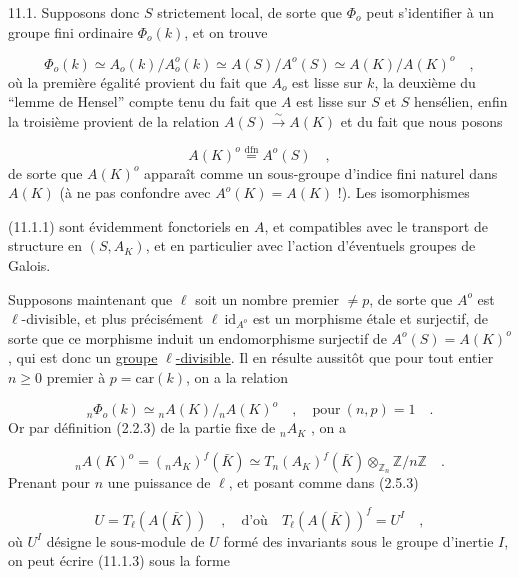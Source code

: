 11.1.  Supposons donc $S$ strictement local, de sorte que $\Phi_{o}$ peut s'identifier à un groupe fini ordinaire $\Phi_{o}(k)$, et on trouve

\begin{equation}\tag{11.1.1}
\Phi_{o}(k) \simeq A_{o}(k)/A_{o}^{o}(k) \simeq A(S)/A^{o}(S) \simeq A(K)/A(K)^{o} \quad ,
\end{equation}
où la première égalité provient du fait que $A_{o}$ est lisse sur $k$, la deuxième du ``lemme de Hensel'' compte tenu du fait que $A$ est lisse sur $S$ et $S$ hensélien, enfin la troisième provient de la relation $A(S) \stackrel{\sim}{\longrightarrow} A(K)$ et du fait que nous posons

\begin{equation}\tag{11.1.2}
A(K)^{o} \stackrel{\mathrm{dfn}}{=} A^{o}(S) \quad ,
\end{equation}
de sorte que $A(K)^{o}$ apparaît comme un sous-groupe d'indice fini naturel dans $A(K)$ (à ne pas confondre avec $A^{o}(K) = A(K)$ !). Les isomorphismes



(11.1.1) sont évidemment fonctoriels en $A$, et compatibles avec le transport de structure en $(S,A_{K})$, et en particulier avec l'action d'éventuels groupes de Galois.

Supposons maintenant que $\ell$ soit un nombre premier $\neq p$, de sorte que $A^{o}$ est $\ell$-divisible, et plus précisément $\ell\ \mathrm{id}_{A^{o}}$ est un morphisme étale et surjectif, de sorte que ce morphisme induit un endomorphisme surjectif de $A^{o}(S)=A(K)^{o}$, qui est donc un \underline{groupe} $\ell$\underline{-divisible}. Il en résulte aussitôt que pour tout entier $n \geq 0$ premier à $p = \mathrm{car}(k)$, on a la relation

\begin{equation}\tag{11.1.3}
{}_{n}\Phi_{o}(k) \simeq {}_{n}A(K)/{}_{n}A(K)^{o} \quad , \quad \mathrm{pour}\ (n,p) = 1 \quad .
\end{equation}
Or par définition (2.2.3) de la partie fixe de ${}_{n}A_{K}$ , on a

\begin{equation}\tag{11.1.4}
{}_{n}A(K)^{o} = ({}_{n}A_{K})^{f}(\bar{K}) \simeq T_{n}(A_{K})^{f}(\bar{K}) \otimes_{\mathbb{Z}_{n}} \mathbb{Z}/n\mathbb{Z} \quad .
\end{equation}
Prenant pour $n$ une puissance de $\ell$, et posant comme dans (2.5.3)

\begin{equation}\tag{11.1.5}
U = T_{\ell}(A(\bar{K})) \quad , \quad \mbox{d'où} \quad T_{\ell}(A(\bar{K}))^{f} = U^{I} \quad ,
\end{equation}
où $U^{I}$ désigne le sous-module de $U$ formé des invariants sous le groupe d'inertie $I$, on peut écrire (11.1.3) sous la forme

